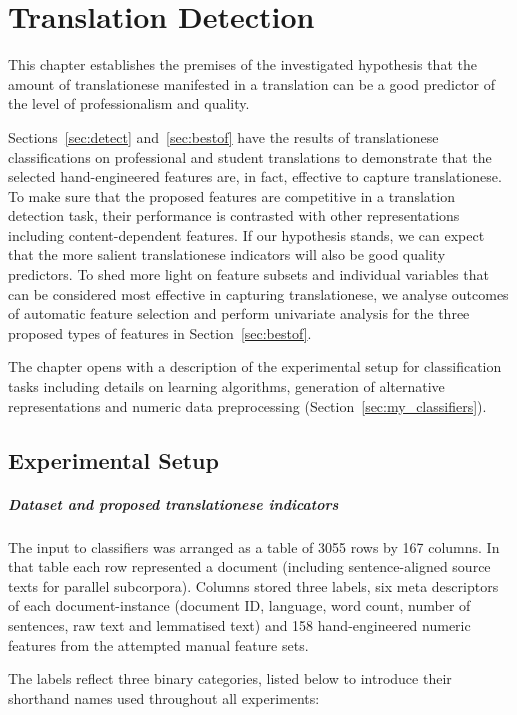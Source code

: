 \chapter{\label{cha:translationese}Translation Detection}
This chapter establishes the premises of the investigated hypothesis that the amount of translationese manifested in a translation can be a good predictor of the level of professionalism and quality. 

Sections~\ref{sec:detect} and~\ref{sec:bestof} have the results of translationese classifications on professional and student translations to demonstrate that the selected hand-engineered features are, in fact, effective to capture translationese. 
To make sure that the proposed features are competitive in a translation detection task, their performance is contrasted with other representations including content-dependent features. 
If our hypothesis stands, we can expect that the more salient translationese indicators will also be good quality predictors. 
To shed more light on feature subsets and individual variables that can be considered most effective in capturing translationese, we analyse outcomes of automatic feature selection and perform univariate analysis for the three proposed types of features in Section~\ref{sec:bestof}.

The chapter opens with a description of the experimental setup for classification tasks including details on learning algorithms, generation of alternative representations and numeric data preprocessing (Section~\ref{sec:my_classifiers}).

\section{\label{sec:my_classifiers}Experimental Setup}

\paragraph{Dataset and proposed translationese indicators} The input to classifiers was arranged as a table of 3055 rows by 167 columns. In that table each row represented a document (including sentence-aligned source texts for parallel subcorpora). Columns stored three labels, six meta descriptors of each document-instance (document ID, language, word count, number of sentences, raw text and lemmatised text) and 158 hand-engineered numeric features from the attempted manual feature sets. 

The labels reflect three binary categories, listed below to introduce their shorthand names used throughout all experiments:

